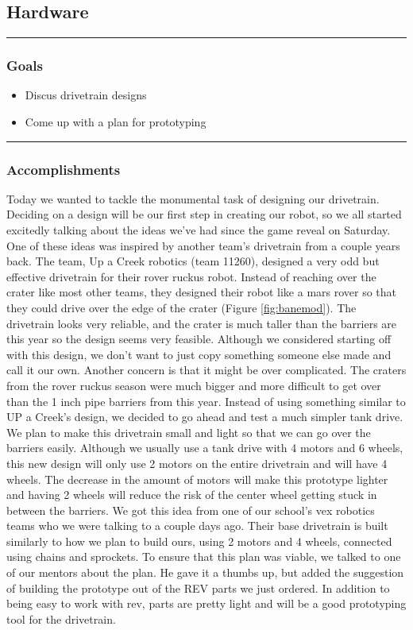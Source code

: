 \subsection*{Hardware}
\noindent\hfil\rule{\textwidth}{.4pt}\hfil
\subsubsection*{Goals}
\begin{itemize}
    \item Discus drivetrain designs
    \item Come up with a plan for prototyping
\end{itemize} 

\noindent\hfil\rule{\textwidth}{.4pt}\hfil

\subsubsection*{Accomplishments}
Today we wanted to tackle the monumental task of designing our drivetrain. Deciding on a design will be our first step in creating our robot, so we all started excitedly talking about the ideas we’ve had since the game reveal on Saturday. One of these ideas was inspired by another team’s drivetrain from a couple years back. The team, Up a Creek robotics (team 11260), designed a very odd but effective drivetrain for their rover ruckus robot. Instead of reaching over the crater like most other teams, they designed their robot like a mars rover so that they could drive over the edge of the crater (Figure \ref{fig:banemod}). The drivetrain looks very reliable, and the crater is much taller than the barriers are this year so the design seems very feasible. Although we considered starting off with this design, we don't want to just copy something someone else made and call it our own. Another concern is that it might be over complicated. The craters from the rover ruckus season were much bigger and more difficult to get over than the 1 inch pipe barriers from this year. 
Instead of using something similar to UP a Creek’s design, we decided to go ahead and test a much simpler tank drive. We plan to make this drivetrain small and light so that we can go over the barriers easily. Although we usually use a tank drive with 4 motors and 6 wheels, this new design will only use 2 motors on the entire drivetrain and will have 4 wheels. The decrease in the amount of motors will make this prototype lighter and having 2 wheels will reduce the risk of the center wheel getting stuck in between the barriers. We got this idea from one of our school’s vex robotics teams who we were talking to a couple days ago. Their base drivetrain is built similarly to how we plan to build ours, using 2 motors and 4 wheels, connected using chains and sprockets. To ensure that this plan was viable, we talked to one of our mentors about the plan. He gave it a thumbs up, but added the suggestion of building the prototype out of the REV parts we just ordered. In addition to being easy to work with rev, parts are pretty light and will be a good prototyping tool for the drivetrain. 

